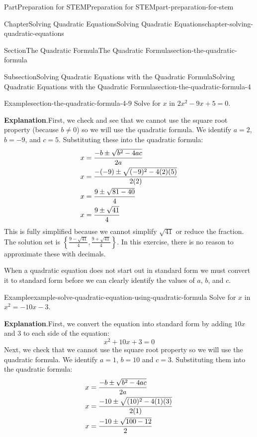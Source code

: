 \documentclass[twoside,10pt,]{book}
\newcommand{\blocktitlefont}{\relax}
\numberwithin{equation}{section}
\newcommand{\substitute}[1]{{\color{blue}{{#1}}}}
\newcommand{\amp}{&}
\begin{document}
\begin{partptx}{Part}{Preparation for STEM}{}{Preparation for STEM}{}{}{part-preparation-for-stem}
\begin{chapterptx}{Chapter}{Solving Quadratic Equations}{}{Solving Quadratic Equations}{}{}{chapter-solving-quadratic-equations}
\begin{sectionptx}{Section}{The Quadratic Formula}{}{The Quadratic Formula}{}{}{section-the-quadratic-formula}
\begin{subsectionptx}{Subsection}{Solving Quadratic Equations with the Quadratic Formula}{}{Solving Quadratic Equations with the Quadratic Formula}{}{}{section-the-quadratic-formula-4}
\begin{example}{Example}{}{section-the-quadratic-formula-4-9}%
Solve for \(x\) in \(2x^2-9x+5=0\).%
\par\smallskip%
{\makeatletter{}\makeatother\noindent\textbf{\blocktitlefont Explanation}.\hypertarget{section-the-quadratic-formula-4-9-2}{}\quad{}First, we check and see that we cannot use the square root property (because \(b\neq0\)) so we will use the quadratic formula. We identify \(a=2\), \(b=-9\), and \(c=5\). Substituting these into the quadratic formula:%
\begin{align*}
x\amp=\frac{-b\pm\sqrt{b^2-4ac}}{2a}\\
x\amp=\frac{-(\substitute{-9})\pm\sqrt{(\substitute{-9})^2-4(\substitute{2})(\substitute{5})}}{2(\substitute{2})}\\
x\amp=\frac{9\pm\sqrt{81-40}}{4}\\
x\amp=\frac{9\pm\sqrt{41}}{4}
\end{align*}
This is fully simplified because we cannot simplify \(\sqrt{41}\) or reduce the fraction. The solution set is \(\left\{\frac{9-\sqrt{41}}{4},\frac{9+\sqrt{41}}{4}\right\}\). In this exercise, there is no reason to approximate these with decimals.%
}\end{example}
When a quadratic equation does not start out in standard form we must convert it to standard form before we can clearly identify the values of \(a\), \(b\), and \(c\).%
\begin{example}{Example}{}{example-solve-quadratic-equation-using-quadratic-formula}%
Solve for \(x\) in \(x^2=-10x-3\).%
\par\smallskip%
{\makeatletter{}\makeatother\noindent\textbf{\blocktitlefont Explanation}.\hypertarget{example-solve-quadratic-equation-using-quadratic-formula-2}{}\quad{}First, we convert the equation into standard form by adding \(10x\) and \(3\) to each side of the equation:%
\begin{equation*}
x^2+10x+3=0
\end{equation*}
Next, we check that we cannot use the square root property so we will use the quadratic formula. We identify \(a=1\), \(b=10\) and \(c=3\). Substituting them into the quadratic formula:%
\begin{align*}
x\amp=\frac{-b\pm\sqrt{b^2-4ac}}{2a}\\
x\amp=\frac{-\substitute{10}\pm\sqrt{(\substitute{10})^2-4(\substitute{1})(\substitute{3})}}{2(\substitute{1})}\\
x\amp=\frac{-10\pm\sqrt{100-12}}{2}\\

\end{align*}}
\end{example}
\end{subsectionptx}
\end{sectionptx}
\end{chapterptx}
\end{partptx}
\end{document}
